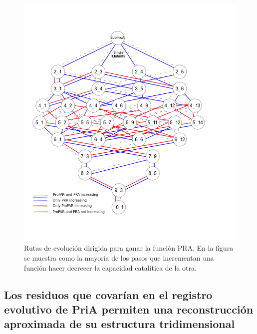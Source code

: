 \documentclass[12pt,twoside]{reedthesis}
\begin{document}
{  \begin{figure}[h!tbp]
  \centering
  \includegraphics[angle = 0,scale = 0.8]{chapter4/LianetFiguras/SolocirculosPRA_PRO_RUTAS_10_1_r002.png}
  \caption[Positive increments on PRA]{\footnotesize{Rutas de evolución dirigida para ganar la función PRA. En la figura se muestra como la mayoría de los pasos que incrementan una función hacer decrecer la capacidad catalítica de la otra. }}
  \label{fig:PRARutas}
  \end{figure}
  
  \subsection{Los residuos que covarían en el registro evolutivo de PriA
  permiten una reconstrucción aproximada de su estructura
  tridimensional}\label{los-residuos-que-covarian-en-el-registro-evolutivo-de-pria-permiten-una-reconstruccion-aproximada-de-su-estructura-tridimensional}
  
}
\end{document}
